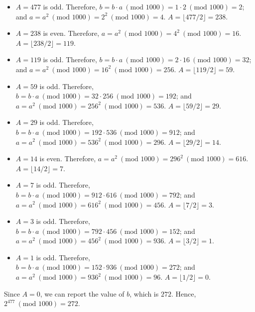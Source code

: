 {\begin{enumerate}
              \begin{itemize}
                  \item \(A = 477\) is odd. Therefore, \(b = b \cdot a \ (\text{mod } 1000) = 1 \cdot 2 \ (\text{mod } 1000) = 2\); and \(a = a^2 \ (\text{mod } 1000) = 2^2 \ (\text{mod } 1000) = 4\). \(A = \lfloor 477 / 2 \rfloor = 238\).
                  \item \(A = 238\) is even. Therefore, \(a = a^2 \ (\text{mod } 1000) = 4^2 \ (\text{mod } 1000) = 16\). \(A = \lfloor 238 / 2 \rfloor = 119\).
                  \item \(A = 119\) is odd. Therefore, \(b = b \cdot a \ (\text{mod } 1000) = 2 \cdot 16 \ (\text{mod } 1000) = 32\); and \(a = a^2 \ (\text{mod } 1000) = 16^2 \ (\text{mod } 1000) = 256\). \(A = \lfloor 119 / 2 \rfloor = 59\).
                  \item \(A = 59\) is odd. Therefore, \(b = b \cdot a \ (\text{mod } 1000) = 32 \cdot 256 \ (\text{mod } 1000) = 192\); and \(a = a^2 \ (\text{mod } 1000) = 256^2 \ (\text{mod } 1000) = 536\). \(A = \lfloor 59 / 2 \rfloor = 29\).
                  \item \(A = 29\) is odd. Therefore, \(b = b \cdot a \ (\text{mod } 1000) = 192 \cdot 536 \ (\text{mod } 1000) = 912\); and \(a = a^2 \ (\text{mod } 1000) = 536^2 \ (\text{mod } 1000) = 296\). \(A = \lfloor 29 / 2 \rfloor = 14\).
                  \item \(A = 14\) is even. Therefore, \(a = a^2 \ (\text{mod } 1000) = 296^2 \ (\text{mod } 1000) = 616\). \(A = \lfloor 14 / 2 \rfloor = 7\).
                  \item \(A = 7\) is odd. Therefore, \(b = b \cdot a \ (\text{mod } 1000) = 912 \cdot 616 \ (\text{mod } 1000) = 792\); and \(a = a^2 \ (\text{mod } 1000) = 616^2 \ (\text{mod } 1000) = 456\). \(A = \lfloor 7 / 2 \rfloor = 3\).
                  \item \(A = 3\) is odd. Therefore, \(b = b \cdot a \ (\text{mod } 1000) = 792 \cdot 456 \ (\text{mod } 1000) = 152\); and \(a = a^2 \ (\text{mod } 1000) = 456^2 \ (\text{mod } 1000) = 936\). \(A = \lfloor 3 / 2 \rfloor = 1\).
                  \item \(A = 1\) is odd. Therefore, \(b = b \cdot a \ (\text{mod } 1000) = 152 \cdot 936 \ (\text{mod } 1000) = 272\); and \(a = a^2 \ (\text{mod } 1000) = 936^2 \ (\text{mod } 1000) = 96\). \(A = \lfloor 1 / 2 \rfloor = 0\).
              \end{itemize}
              Since \(A = 0\), we can report the value of \(b\), which is \(272\). Hence, \(2^477 \ (\text{mod }1000) = 272\).
    \end{enumerate}
}

